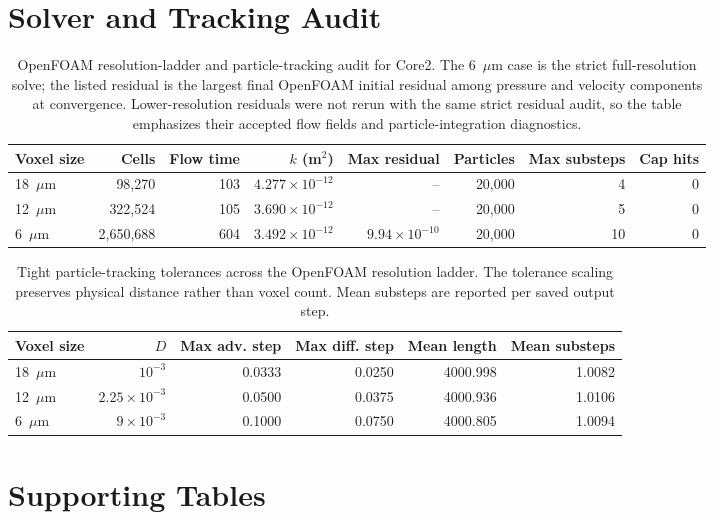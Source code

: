 \documentclass[11pt]{article}
\begin{document}
\section*{Solver and Tracking Audit}

\begin{table}[!htbp]
\centering
\caption{OpenFOAM resolution-ladder and particle-tracking audit for Core2. The 6~$\mu$m case is the strict full-resolution solve; the listed residual is the largest final OpenFOAM initial residual among pressure and velocity components at convergence. Lower-resolution residuals were not rerun with the same strict residual audit, so the table emphasizes their accepted flow fields and particle-integration diagnostics.}
\label{tab:Ssolveraudit}
\scriptsize
\begin{tabular}{lrrrrrrr}
\toprule
Voxel size & Cells & Flow time & $k$ (m$^2$) & Max residual & Particles & Max substeps & Cap hits \\
\midrule
18~$\mu$m & 98,270 & 103 & $4.277\times10^{-12}$ & -- & 20,000 & 4 & 0 \\
12~$\mu$m & 322,524 & 105 & $3.690\times10^{-12}$ & -- & 20,000 & 5 & 0 \\
6~$\mu$m & 2,650,688 & 604 & $3.492\times10^{-12}$ & $9.94\times10^{-10}$ & 20,000 & 10 & 0 \\
\bottomrule
\end{tabular}
\end{table}

\begin{table}[!htbp]
\centering
\caption{Tight particle-tracking tolerances across the OpenFOAM resolution ladder. The tolerance scaling preserves physical distance rather than voxel count. Mean substeps are reported per saved output step.}
\label{tab:Strackingaudit}
\small
\begin{tabular}{lrrrrr}
\toprule
Voxel size & $D$ & Max adv. step & Max diff. step & Mean length & Mean substeps \\
\midrule
18~$\mu$m & $10^{-3}$ & 0.0333 & 0.0250 & 4000.998 & 1.0082 \\
12~$\mu$m & $2.25\times10^{-3}$ & 0.0500 & 0.0375 & 4000.936 & 1.0106 \\
6~$\mu$m & $9\times10^{-3}$ & 0.1000 & 0.0750 & 4000.805 & 1.0094 \\
\bottomrule
\end{tabular}
\end{table}

\section*{Supporting Tables}
\end{document}

